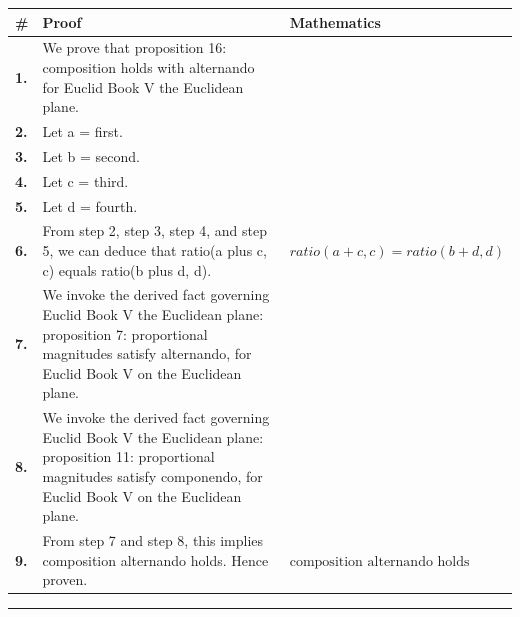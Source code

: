 \documentclass[11pt]{article}
\theoremstyle{definition}
\begin{document}
\begin{tabular}{@{} >{\raggedright\arraybackslash}p{} >{\raggedright\arraybackslash}p{} >{\raggedleft\arraybackslash}p{} @{}}
\textbf{\#} & \textbf{Proof} & \textbf{Mathematics} \\
\midrule
\textbf{1.} & We prove that proposition 16: composition holds with alternando for Euclid Book V the Euclidean plane. & \\[0.45em]
\textbf{2.} & Let a = first. & \\[0.45em]
\textbf{3.} & Let b = second. & \\[0.45em]
\textbf{4.} & Let c = third. & \\[0.45em]
\textbf{5.} & Let d = fourth. & \\[0.45em]
\textbf{6.} & From step 2, step 3, step 4, and step 5, we can deduce that ratio(a plus c, c) equals ratio(b plus d, d). & $\displaystyle ratio(a + c, c) = ratio(b + d, d)$ \\[0.45em]
\textbf{7.} & We invoke the derived fact governing Euclid Book V the Euclidean plane: proposition 7: proportional magnitudes satisfy alternando, for Euclid Book V on the Euclidean plane. & \\[0.45em]
\textbf{8.} & We invoke the derived fact governing Euclid Book V the Euclidean plane: proposition 11: proportional magnitudes satisfy componendo, for Euclid Book V on the Euclidean plane. & \\[0.45em]
\textbf{9.} & From step 7 and step 8, this implies composition alternando holds. Hence proven. & $\displaystyle \text{composition alternando holds}$ \\[0.45em]
\bottomrule
\end{tabular}
\label{thm:Geometry-Euclid Book V-proposition_16_composition_holds_with_alternando}
\par\medskip\hrule
\end{document}

